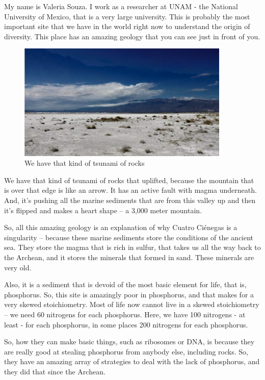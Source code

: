 \documentclass[]{article}
\begin{document}
My name is Valeria Souza. I work as a researcher at UNAM - the National University of Mexico, that is a very large university. This is probably the most important site
that we have in the world right now to understand the origin of diversity. This place has an amazing geology that you can see just in front of you.\cite{souza2018lost}

\begin{figure}[h!]
	\caption{We have that kind of tsunami of rocks} 
	\includegraphics[width=0.9\textwidth]{CuatroCienegas2}
\end{figure}

We have that kind of tsunami of rocks that uplifted, because the mountain
that is over that edge is like an arrow. It has an active fault
with magma underneath. And, it's pushing all the marine sediments that are from this valley up and then it's flipped and makes a heart shape -- a 3,000 meter mountain.

So, all this amazing geology is an explanation of why Cuatro  Ci\'enegas is a singularity -- because these marine sediments store the conditions of the ancient sea. They store the magma that is rich in sulfur, that takes us all the way back to the Archean, and it stores the minerals that formed in sand. These minerals are very old.

Also, it is a sediment that is devoid of the most basic element for life, that is, phosphorus. So, this site is amazingly poor in phosphorus, and that makes for a very
skewed stoichiometry. Most of life now cannot live in a skewed stoichiometry -- we need 60 nitrogens for each phosphorus. Here, we have 100 nitrogens - at least - for each phosphorus, in some places 200 nitrogens for each phosphorus.

So, how they can make basic things, such as ribosomes or DNA, is because they are really good at stealing phosphorus from anybody else, including rocks. So, they have an amazing array of strategies to deal with the lack of phosphorus, and they did that since the Archean.
\end{document}

